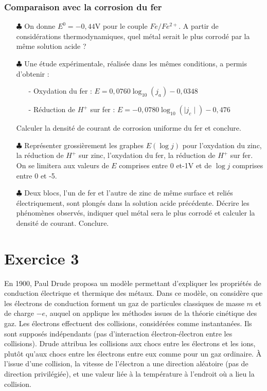 \documentclass{report}
\begin{document}
\subsubsection*{Comparaison avec la corrosion du fer}

\begin{itemize}
	
		\item[$\clubsuit$] On donne $E^0=-0,44$V pour le couple $Fe/Fe^{2+}$. A partir de considérations thermodynamiques, quel métal serait le plus corrodé par la même solution acide ?
		
	\item[$\clubsuit$] Une étude expérimentale, réalisée dans les mêmes conditions, a permis d'obtenir :
	\begin{itemize}
		\item[-] Oxydation du fer : $E=0,0760\log_{10}(j_a)-0,0348$
		\item[-] Réduction de $H^+$ sur fer : $E=-0,0780\log_{10}(\mid j_c\mid)-0,476$
	\end{itemize}
	Calculer la densité de courant de corrosion uniforme du fer et conclure.
		
	\item[$\clubsuit$] Représenter grossièrement les graphes $E(\log j)$ pour l'oxydation du zinc, la réduction de $H^+$ sur zinc, l'oxydation du fer, la réduction de $H^+$ sur fer. On se limitera aux valeurs de $E$ comprises entre 0 et-1V et de $\log j$ comprises entre 0 et -5.
	
	\item[$\clubsuit$] Deux blocs, l'un de fer et l'autre de zinc de même surface et reliés électriquement, sont plongés dans la solution acide précédente. Décrire les phénomènes observés, indiquer quel métal sera le plus corrodé et calculer la densité de courant. Conclure. 
	
\end{itemize}

\newpage

\section*{Exercice 3}

En 1900, Paul Drude proposa un modèle permettant d'expliquer les propriétés de conduction électrique et thermique des métaux. Dans ce modèle, on considère que les électrons de conduction forment un gaz de particules classiques de masse $m$ et de charge $-e$, auquel on applique les méthodes issues de la théorie cinétique des gaz. Les électrons effectuent des collisions, considérées comme instantanées. Ils sont supposés indépendants (pas d'interaction électron-électron entre les collisions). Drude attribua les collisions aux chocs entre les électrons et les ions, plutôt qu'aux chocs entre les électrons entre eux comme pour un gaz ordinaire. À l'issue d'une collision, la vitesse de l'électron a une direction aléatoire (pas de direction privilégiée), et une valeur liée à la température à l'endroit où a lieu la collision.
\end{document}
